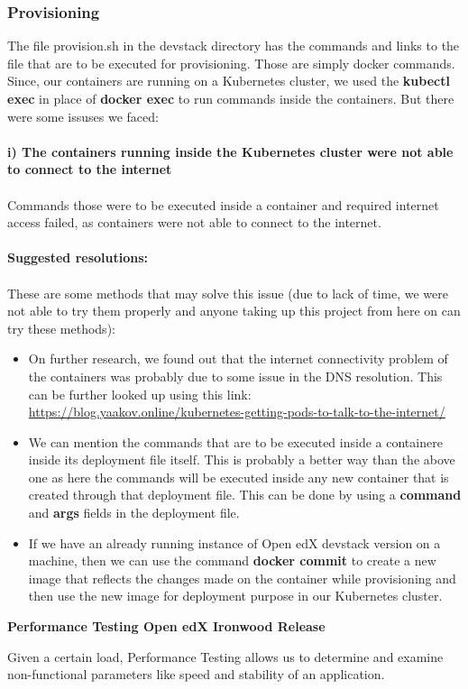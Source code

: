 \documentclass[12pt]{article}
\begin{document}
\subsubsection{Provisioning}
The file provision.sh in the devstack directory has the commands and links to the file that are to be executed for provisioning. Those are simply docker commands. Since, our containers are running on a Kubernetes cluster, we used the \textbf{kubectl exec} in place of \textbf{docker exec} to run commands inside the containers. But there were some issuses we faced: \\\\
\textbf{i) The containers running inside the Kubernetes cluster were not able to connect to the internet}\\\\
Commands those were to be executed inside a container and required internet access failed, as containers were not able to connect to the internet.\\\\
\textbf{Suggested resolutions:\\\\}These are some methods that may solve this issue (due to lack of time, we were not able to try them properly and anyone taking up this project from here on can try these methods):
\begin{itemize}
	\item On further research, we found out that the internet connectivity problem of the containers was probably due to some issue in the DNS resolution. This can be further looked up using this link: \href{https://blog.yaakov.online/kubernetes-getting-pods-to-talk-to-the-internet/}{https://blog.yaakov.online/kubernetes-getting-pods-to-talk-to-the-internet/}\cite{DNS}
	\item We can mention the commands that are to be executed inside a containere inside its deployment file itself. This is probably a better way than the above one as here the commands will be executed inside any new container that is created through that deployment file. This can be done by using a \textbf{command} and \textbf{args} fields in the deployment file.
	\item If we have an already running instance of Open edX devstack version on a machine, then we can use the command \textbf{docker commit} to create a new image that reflects the changes made on the container while provisioning and then use the new image for deployment purpose in our Kubernetes cluster.
\end{itemize}
\pagebreak
\begin{center}
	\textbf{\Large{Performance Testing Open edX Ironwood Release}}
\end{center}
Given a certain load, Performance Testing allows us to determine and examine non-functional parameters like speed and stability of an application.
\par
\end{document}
